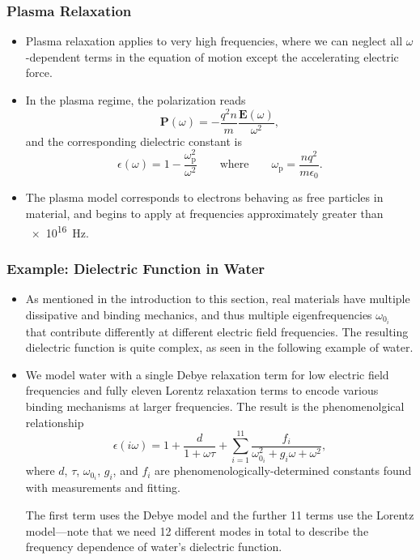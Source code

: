 \documentclass[11pt, a4paper]{article}
\renewcommand{\vec}[1]{\bm{#1}} %
\newcommand{\E}{\vec{E}} %
\renewcommand{\P}{\vec{P}}  %
\begin{document}
\subsubsection{Plasma Relaxation}
\begin{itemize}
    \item Plasma relaxation applies to very high frequencies, where we can neglect all $ \omega $-dependent terms in the equation of motion except the accelerating electric force.

    \item In the plasma regime, the polarization reads
    \begin{equation*}
        \P(\omega) = - \frac{q^{2}n}{m} \frac{\E(\omega)}{\omega^{2}},
    \end{equation*}
    and the corresponding dielectric constant is
    \begin{equation*}
        \epsilon(\omega) = 1 - \frac{\omega_{\text{p}}^{2}}{\omega^{2}} \qquad \text{where} \qquad \omega_{\text{p}} = \frac{nq^{2}}{m\epsilon_{0}}. 
    \end{equation*}
    
    \item The plasma model corresponds to electrons behaving as free particles in material, and begins to apply at frequencies approximately greater than \SI{e16}{\hertz}.
\end{itemize}

\subsubsection{Example: Dielectric Function in Water}
\begin{itemize}
    \item As mentioned in the introduction to this section, real materials have multiple dissipative and binding mechanics, and thus multiple eigenfrequencies $ \omega_{0_{i}} $ that contribute differently at different electric field frequencies. The resulting dielectric function is quite complex, as seen in the following example of water. 

    \item We model water with a single Debye relaxation term for low electric field frequencies and fully eleven Lorentz relaxation terms to encode various binding mechanisms at larger frequencies. The result is the phenomenolgical relationship
    \begin{equation*}
        \epsilon(i\omega) = 1 + \frac{d}{1 + \omega\tau} + \sum_{i = 1}^{11} \frac{f_{i}}{\omega_{0_{i}}^{2} + g_{i}\omega + \omega^{2}},
    \end{equation*}
    where $ d $, $ \tau $, $ \omega_{0_{i}} $, $ g_{i} $, and $ f_{i} $ are phenomenologically-determined constants found with measurements and fitting.

    The first term uses the Debye model and the further 11 terms use the Lorentz model---note that we need 12 different modes in total to describe the frequency dependence of water's dielectric function.
    
\end{itemize}
\end{document}
